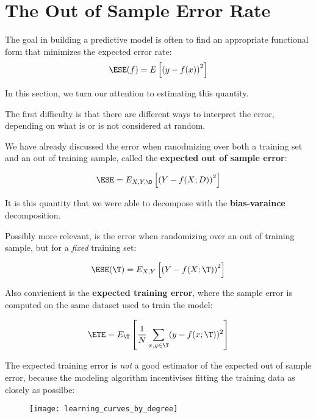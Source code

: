 \section{The Out of Sample Error Rate}
%
%
\begin{frame}
  The goal in building a predictive model is often to find an
  appropriate functional form that minimizes the expected error
  rate:
  $$\ESE(f) = E \left[ \left( y - f(x) \right)^2 \right]$$
\end{frame}
%
%
\begin{frame}
  In this section, we turn our attention to estimating this quantity.
\end{frame}
%
%
\begin{frame}
  The first difficulty is that there are different ways to interpret the error,
  depending on what is or is not considered at random.
\end{frame}
%
%
\begin{frame}
  We have already discussed the error when ranodmizing over both a training set
  and an out of training sample, called the \textbf{expected out of sample
  error}:

  $$\ESE = E_{X,Y,\D} \left[ \left( Y - f(X; D) \right)^2 \right]$$

  It is this quantity that we were able to decompose with the
  \textbf{bias-varaince} decomposition.
\end{frame}
%
%
\begin{frame}
  Possibly more relevant, is the error when randomizing over an out of training
  sample, but for a \textit{fixed} training set:

  $$\ESE(\T) = E_{X,Y} \left[ \left( Y - f(X; \T) \right)^2 \right]$$
\end{frame}
%
%
\begin{frame}
  Also convienient is the \textbf{expected training error}, where the sample error is
  computed on the same dataset used to train the model:

  $$\ETE = E_{\T} \left[ \frac{1}{N} \sum_{x,y \in \T} (y - f(x; \T))^2 \right] $$
\end{frame}
%
%
\begin{frame}
  The expected training error is \textit{not} a good estimator of the expected
  out of sample error, because the modeling algorithm incentivises fitting the
  training data as closely as possilbe:
  \begin{figure}
    \texttt{[image: learning\_curves\_by\_degree]}
  \end{figure}
\end{frame}
